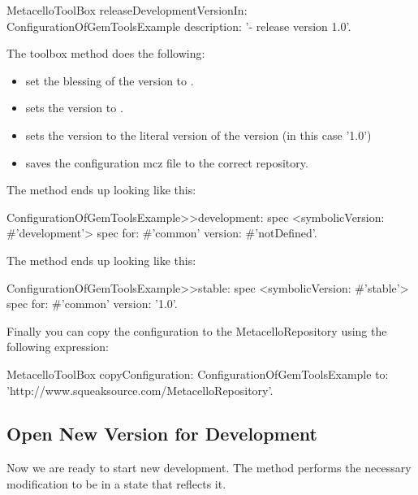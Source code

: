 \documentclass[a4paper,10pt,twoside]{book}
\begin{document}
\begin{code}{}
\begin{code}{}
\begin{code}{}
  MetacelloToolBox
     releaseDevelopmentVersionIn: ConfigurationOfGemToolsExample
     description: '- release version 1.0'.
\end{code}     

The toolbox method  does the following:
\begin{itemize}
\item set the blessing of the  version to .
\item sets the  version to .
\item sets the  version to the literal version of the  version (in this case '1.0')
\item saves the configuration mcz file to the correct repository.
\end{itemize}


The  method ends up looking like this:

\begin{code}{}
ConfigurationOfGemToolsExample>>development: spec
  <symbolicVersion: #'development'>
  spec for: #'common' version: #'notDefined'.
\end{code}  
  
The  method ends up looking like this:

\begin{code}{}
ConfigurationOfGemToolsExample>>stable: spec
  <symbolicVersion: #'stable'>
  spec for: #'common' version: '1.0'.
\end{code}  
  
Finally you can copy the configuration to the MetacelloRepository using the following expression:

\begin{code}{}
  MetacelloToolBox
     copyConfiguration: ConfigurationOfGemToolsExample
     to: 'http://www.squeaksource.com/MetacelloRepository'.
\end{code}


\subsection{Open New Version for Development}

Now we are ready to start new development. The method 
performs the necessary modification to be in a state that reflects it. 



\end{code}
\end{code}
\end{document}
